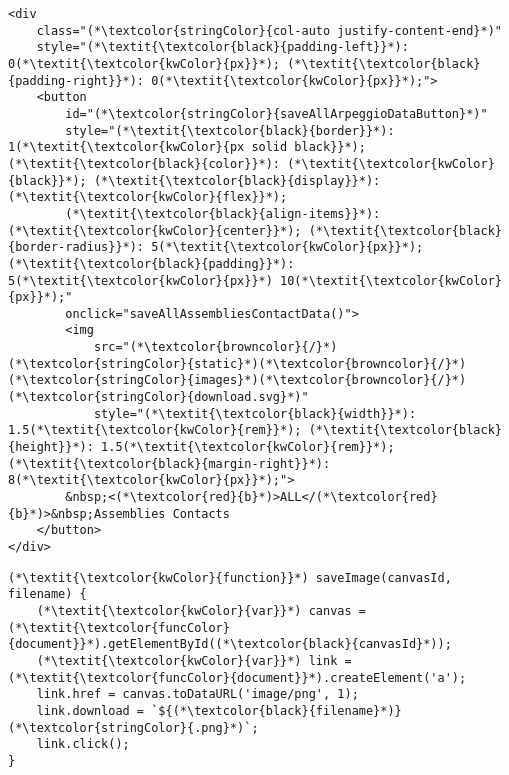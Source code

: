 \lstset{style=mystyle}

\begin{lstlisting}[language=MyHTML, caption={[HTML \texttt{saveAllArpeggioDataButton} download button]\textbf{HTML \texttt{saveAllArpeggioDataButton} download button.} This HTML element contains a button (\texttt{saveAllArpeggioDataButton}) that downloads the pdbe-arpeggio protein-ligand contacts for all biological assemblies mapping to a protein segment. The JavaScript \texttt{saveAllAssembliesContactData} function is called upon clicking. A combination of Bootstrap classes and custom CSS is used for styling.}, label={html_button}]
<div
	class="(*\textcolor{stringColor}{col-auto justify-content-end}*)"
	style="(*\textit{\textcolor{black}{padding-left}}*): 0(*\textit{\textcolor{kwColor}{px}}*); (*\textit{\textcolor{black}{padding-right}}*): 0(*\textit{\textcolor{kwColor}{px}}*);">
	<button
		id="(*\textcolor{stringColor}{saveAllArpeggioDataButton}*)" 
		style="(*\textit{\textcolor{black}{border}}*): 1(*\textit{\textcolor{kwColor}{px solid black}}*); (*\textit{\textcolor{black}{color}}*): (*\textit{\textcolor{kwColor}{black}}*); (*\textit{\textcolor{black}{display}}*): (*\textit{\textcolor{kwColor}{flex}}*);
		(*\textit{\textcolor{black}{align-items}}*): (*\textit{\textcolor{kwColor}{center}}*); (*\textit{\textcolor{black}{border-radius}}*): 5(*\textit{\textcolor{kwColor}{px}}*); (*\textit{\textcolor{black}{padding}}*): 5(*\textit{\textcolor{kwColor}{px}}*) 10(*\textit{\textcolor{kwColor}{px}}*);" 
		onclick="saveAllAssembliesContactData()">
		<img
			src="(*\textcolor{browncolor}{/}*)(*\textcolor{stringColor}{static}*)(*\textcolor{browncolor}{/}*)(*\textcolor{stringColor}{images}*)(*\textcolor{browncolor}{/}*)(*\textcolor{stringColor}{download.svg}*)"
			style="(*\textit{\textcolor{black}{width}}*): 1.5(*\textit{\textcolor{kwColor}{rem}}*); (*\textit{\textcolor{black}{height}}*): 1.5(*\textit{\textcolor{kwColor}{rem}}*); (*\textit{\textcolor{black}{margin-right}}*): 8(*\textit{\textcolor{kwColor}{px}}*);">
		&nbsp;<(*\textcolor{red}{b}*)>ALL</(*\textcolor{red}{b}*)>&nbsp;Assemblies Contacts
	</button>
</div>
\end{lstlisting}

\begin{lstlisting}[language=MyJavaScript, caption={[JavaScript \texttt{saveImage} function]\textbf{JavaScript \texttt{saveImage} function.} \texttt{saveImage} JavaScript function as implemented in LIGYSIS-web. This function takes an HTML canvas element identifier (\texttt{canvasId}) and a file name (\texttt{filename}) and saves a screenshot as a PNG file. It is used to save images from the Chart.js graphs as well as the 3Dmol.js viewer.}, label={saveimage_func}]
(*\textit{\textcolor{kwColor}{function}}*) saveImage(canvasId, filename) {
	(*\textit{\textcolor{kwColor}{var}}*) canvas = (*\textit{\textcolor{funcColor}{document}}*).getElementById((*\textcolor{black}{canvasId}*));
	(*\textit{\textcolor{kwColor}{var}}*) link = (*\textit{\textcolor{funcColor}{document}}*).createElement('a');
	link.href = canvas.toDataURL('image/png', 1);
	link.download = `${(*\textcolor{black}{filename}*)}(*\textcolor{stringColor}{.png}*)`;
	link.click();
}
\end{lstlisting}

